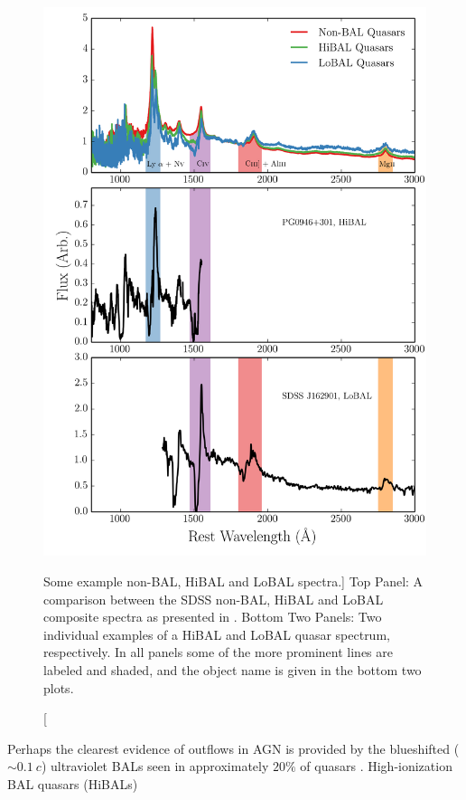 \begin{figure}
\centering
\includegraphics[width=1.0\textwidth]{figures/02-outflows/bal_spectra.png}
\caption
[Some example non-BAL, HiBAL and LoBAL spectra.]
{
Top Panel: A comparison between the SDSS non-BAL, HiBAL and LoBAL
composite spectra as presented in \cite{reichard2003}. 
Bottom Two Panels: Two individual examples of a HiBAL and LoBAL quasar
spectrum, respectively. In all panels some of the more prominent
lines are labeled and shaded, and the object name is given in 
the bottom two plots.
} 
\label{fig:bals}
\end{figure}
Perhaps the clearest evidence of outflows in AGN is provided by  
the blueshifted ($\sim 0.1~c$) ultraviolet 
BALs seen in approximately $20\%$ of quasars
\citep{weymann1991, knigge2008, dai2008, allen2011}. 
High-ionization BAL quasars (HiBALs)
